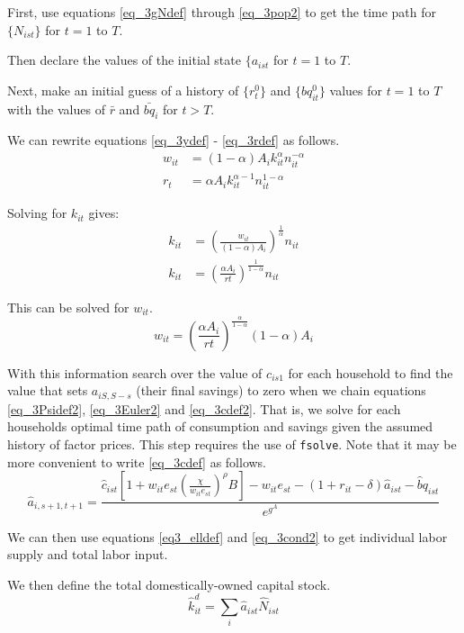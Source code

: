 \documentclass[letterpaper,12pt]{article}
\theoremstyle{definition}
\numberwithin{equation}{section}
\begin{document}
\begin{spacing}{1.5}
	First, use equations \eqref{eq_3gNdef} through \eqref{eq_3pop2} to get the time path for $\{N_{ist}\}$ for $t=1$ to $T$.

	Then declare the values of the initial state $\{a_{ist}$ for $t=1$ to $T$.

	Next, make an initial guess of a history of $\{r^0_t\}$ and $\{bq^0_{it}\}$ values for $t=1$ to $T$ with the values of $\bar r$ and $\bar {bq}_i$ for $t>T$.

	We can rewrite equations \eqref{eq_3ydef} - \eqref{eq_3rdef} as follows.
	\begin{align}
		w_{it} & = (1-\alpha) A_i k_{it}^\alpha n_{it}^{-\alpha} \nonumber \\
		r_{t} & = \alpha A_i k_{it}^{\alpha-1} n_{it}^{1-\alpha} \nonumber
	\end{align}

	Solving for $k_{it}$ gives:
	\begin{align}
		k_{it} & = \left(\frac{w_{it}}{(1-\alpha)A_i} \right)^{\frac{1}{\alpha}} n_{it} \nonumber \\
		k_{it} & = \left(\frac{\alpha A_i}{r{t}} \right)^{\frac{1}{1-\alpha}} n_{it} \nonumber
	\end{align}

	This can be solved for $w_{it}$.
	\begin{equation}
		w_{it} = \left(\frac{\alpha A_i}{r{t}} \right)^{\frac{\alpha}{1-\alpha}} (1-\alpha) A_i \label{eq_3wfunc}
	\end{equation}

	With this information search over the value of $c_{is1}$ for each household to find the value that sets $a_{iS,S-s}$ (their final savings) to zero when we chain equations \eqref{eq_3Psidef2}, \eqref{eq_3Euler2} and \eqref{eq_3cdef2}.  That is, we solve for each households optimal time path of consumption and savings given the assumed history of factor prices.  This step requires the use of \texttt{fsolve}.  Note that it may be more convenient to write \eqref{eq_3cdef} as follows.
	\begin{equation}
		\hat a_{i,s+1,t+1} = \frac{\hat c_{ist} \left[ 1 + w_{it} e_{st} \left(\frac{\chi} {w_{it} e_{st}}\right)^{\rho}B \right] - w_{it} e_{st} - (1+r_{it}-\delta)\hat a_{ist} - {\hat bq}_{ist}}{e^{g^A}}
	\end{equation}

	We can then use equations \eqref{eq3_elldef} and \eqref{eq_3cond2} to get individual labor supply and total labor input.

	We then define the total domestically-owned capital stock.
	\begin{equation}
		\hat k^d_{it} = \sum_i \hat a_{ist} \hat N_{ist} \label{eq_3kddef}
	\end{equation}


\end{spacing}
\end{document}
